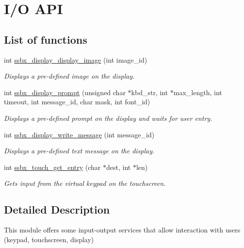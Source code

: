 \hypertarget{group__ssbx___i_o}{}\section{I/O A\+PI}
\label{group__ssbx___i_o}
\subsection*{List of functions}
\begin{DoxyCompactItemize}
\item
int \hyperlink{group__ssbx___i_o_ga52d5005d7bb36355592b9ef2309281e2}{ssbx\+\_\+display\+\_\+display\+\_\+image} (int image\+\_\+id)
\begin{DoxyCompactList}\small\item\em Displays a pre-\/defined image on the display. \end{DoxyCompactList}\item
int \hyperlink{group__ssbx___i_o_ga701c4c43823bad80a39745de2b5ad3af}{ssbx\+\_\+display\+\_\+prompt} (unsigned char $\ast$kbd\+\_\+str, int $\ast$max\+\_\+length, int timeout, int message\+\_\+id, char mask, int font\+\_\+id)
\begin{DoxyCompactList}\small\item\em Displays a pre-\/defined prompt on the display and waits for user entry. \end{DoxyCompactList}\item
int \hyperlink{group__ssbx___i_o_ga40574f625e50f59357a9c363305bf76e}{ssbx\+\_\+display\+\_\+write\+\_\+message} (int message\+\_\+id)
\begin{DoxyCompactList}\small\item\em Displays a pre-\/defined text message on the display. \end{DoxyCompactList}\item
int \hyperlink{group__ssbx___i_o_gaefc88ab3af9c2f984281ac32723d0633}{ssbx\+\_\+touch\+\_\+get\+\_\+entry} (char $\ast$dest, int $\ast$len)
\begin{DoxyCompactList}\small\item\em Gets input from the virtual keypad on the touchscreen. \end{DoxyCompactList}\end{DoxyCompactItemize}


\subsection{Detailed Description}
This module offers some input-\/output services that allow interaction with users (keypad, touchscreen, display)

